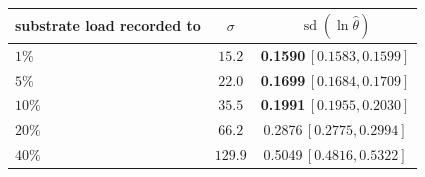 \begin{tabular}{@{}lcc@{}}
\toprule
\textbf{substrate load recorded to} & \textbf{$\sigma$} & \textbf{$\operatorname{sd}(\ln\hat\theta)$} \\
\midrule
$1\%$ & $15.2$ & \textbf{0.1590}\,\scriptsize$[0.1583, 0.1599]$ \\
$5\%$ & $22.0$ & \textbf{0.1699}\,\scriptsize$[0.1684, 0.1709]$ \\
$10\%$ & $35.5$ & \textbf{0.1991}\,\scriptsize$[0.1955, 0.2030]$ \\
$20\%$ & $66.2$ & 0.2876\,\scriptsize$[0.2775, 0.2994]$ \\
$40\%$ & $129.9$ & 0.5049\,\scriptsize$[0.4816, 0.5322]$ \\
\bottomrule
\end{tabular}
